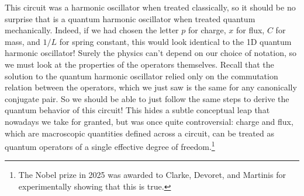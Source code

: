 This circuit was a harmonic oscillator when treated classically, so it should be no surprise that is a quantum harmonic oscillator when treated quantum mechanically. Indeed, if we had chosen the letter $p$ for charge, $x$ for flux, $C$ for mass, and $1/L$ for spring constant, this would look identical to the 1D quantum harmonic oscillator! Surely the physics can't depend on our choice of notation, so we must look at the properties of the operators themselves. Recall that the solution to the quantum harmonic oscillator relied only on the commutation relation between the operators, which we just saw is the same for any canonically conjugate pair. So we should be able to just follow the same steps to derive the quantum behavior of this circuit! This hides a subtle conceptual leap that nowadays we take for granted, but was once quite controversial: charge and flux, which are macroscopic quantities defined across a circuit, can be treated as quantum operators of a single effective degree of freedom.\footnote{The Nobel prize in 2025 was awarded to Clarke, Devoret, and Martinis for experimentally showing that this is true.}

